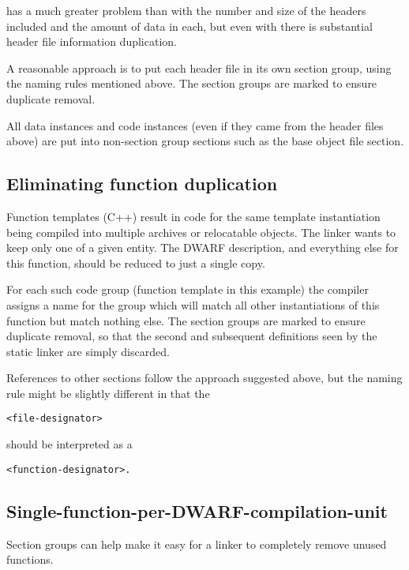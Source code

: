  has a much greater 
problem than 
 with the number and
size of the headers included and the amount of data in each,
but even with  
there is substantial header file information
duplication.

A reasonable approach is to put each header file in its own
section group, using the naming rules mentioned above. The
section groups are marked to ensure duplicate removal.

All data instances and code instances (even if they came
from the header files above) are put into non-section group
sections such as the base object file 
 section.

\subsection{Eliminating function duplication}
\label{app:eliminatingfunctionduplication}


Function templates (C++) result in code for the same template
instantiation being compiled into multiple archives or
relocatable objects. The linker wants to keep only one of a
given entity. The DWARF description, and everything else for
this function, should be reduced to just a single copy.

For each such code group (function template in this example)
the compiler assigns a name for the group which will match
all other instantiations of this function but match nothing
else. The section groups are marked to ensure duplicate
removal, so that the second and subsequent definitions seen
by the static linker are simply discarded.


References to other 
 sections follow the approach
suggested above, but the naming rule might be slightly
different in that the 
\begin{alltt}
<file-designator> 
\end{alltt}
should be interpreted
as a 
\begin{alltt}
<function-designator>.
\end{alltt}



\subsection{Single-function-per-DWARF-compilation-unit}
\label{app:singlefunctionperdwarfcompilationunit}

Section groups can help make it easy for a linker to completely
remove unused functions.

